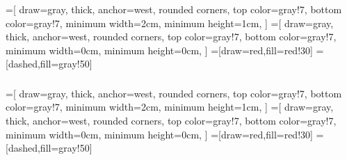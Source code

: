 \documentclass[usenames,dvipsnames, 18pt, compress, aspectratio=169]{beamer}
\begin{document}
\fontsize{14pt}{16}\selectfont
\begin{frame}
    \frametitle{}
    \begin{center}
    =[
        draw=gray,
        thick,
        anchor=west,
        rounded corners,
        top color=gray!7,
        bottom color=gray!7,
        minimum width=2cm,
        minimum height=1cm,
    ]
    =[
        draw=gray,
        thick,
        anchor=west,
        rounded corners,
        top color=gray!7,
        bottom color=gray!7,
        minimum width=0cm,
        minimum height=0cm,
    ]
    =[draw=red,fill=red!30]
    =[dashed,fill=gray!50]

    \end{center}
\end{frame}

\fontsize{14pt}{16}\selectfont
\begin{frame}
    \frametitle{}
    \begin{center}
    =[
        draw=gray,
        thick,
        anchor=west,
        rounded corners,
        top color=gray!7,
        bottom color=gray!7,
        minimum width=2cm,
        minimum height=1cm,
    ]
    =[
        draw=gray,
        thick,
        anchor=west,
        rounded corners,
        top color=gray!7,
        bottom color=gray!7,
        minimum width=0cm,
        minimum height=0cm,
    ]
    =[draw=red,fill=red!30]
    =[dashed,fill=gray!50]

    \end{center}
\end{frame}
\end{document}
